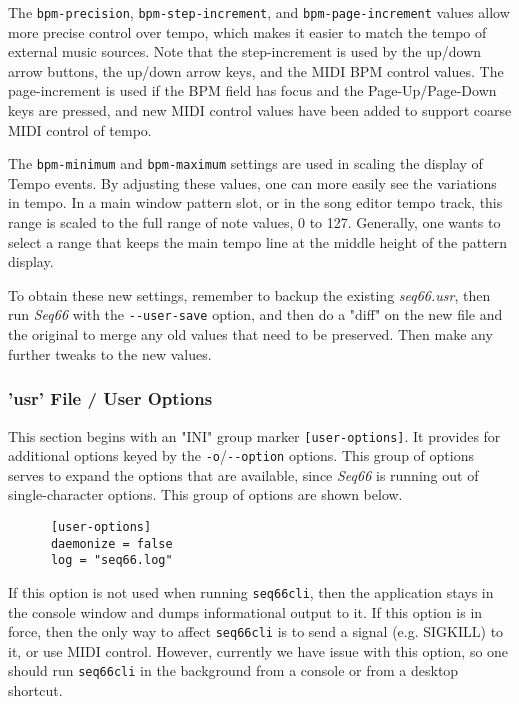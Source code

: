    The \texttt{bpm-precision}, \texttt{bpm-step-increment}, and
   \texttt{bpm-page-increment} values allow more precise control over tempo,
   which makes it easier to match the tempo of external music sources.  Note
   that the step-increment is used by the up/down arrow buttons, the up/down
   arrow keys, and the MIDI BPM control values.  The page-increment is used
   if the BPM field has focus and the Page-Up/Page-Down keys are pressed,
   and new MIDI control values have been added to support coarse MIDI
   control of tempo.

   The \texttt{bpm-minimum} and \texttt{bpm-maximum} settings
   are used in scaling the display of Tempo events.
   By adjusting these values, one can more easily see the variations in
   tempo.  In a main window pattern slot, or in the song editor tempo track,
   this range is scaled to the full range of note values, 0 to 127.
   Generally, one wants to select a range that keeps the main tempo line at
   the middle height of the pattern display.

   To obtain these new settings, remember to backup the existing
   \textsl{seq66.usr}, then run \textsl{Seq66} with the
   \texttt{-{}-user-save} option, and then do a "diff" on the new file and the
   original to merge any old values that need to be preserved.  Then make any
   further tweaks to the new values.

\subsubsection{'usr' File / User Options}
\label{subsubsec:usr_file_user_options}

   This section begins with an
   "INI" group marker \texttt{[user-options]}.
   It provides for additional options keyed by the
   \texttt{-o}/\texttt{-{}-option} options.
   This group of options serves to expand the options that are available, since
   \textsl{Seq66} is running out of single-character options.
   This group of options are shown below.

   \begin{verbatim}
      [user-options]
      daemonize = false
      log = "seq66.log"
   \end{verbatim}

   If this option is not used when running \texttt{seq66cli}, then the
   application stays in the console window and dumps informational output to
   it.  If this option is in force, then the only way to affect
   \texttt{seq66cli} is to send a signal (e.g. SIGKILL) to it, or use
   MIDI control.
   However, currently we have issue with this option, so one should run
   \texttt{seq66cli} in the background from a console or from a desktop shortcut.

